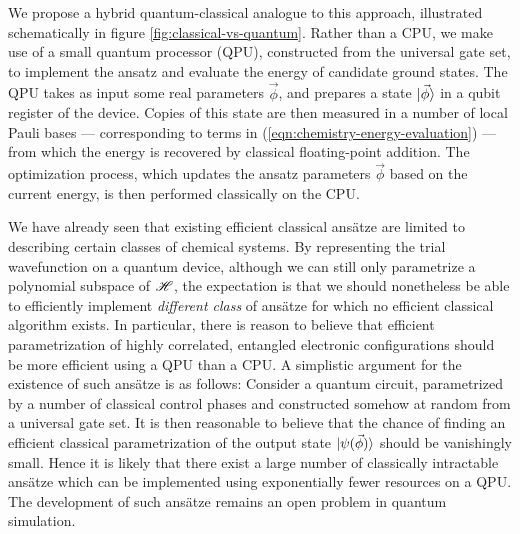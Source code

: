 We propose a hybrid quantum-classical analogue to this approach, illustrated schematically in figure \ref{fig:classical-vs-quantum}. Rather than a CPU, we make use of a small quantum processor (QPU), constructed from the universal gate set, to implement the ansatz and evaluate the energy of candidate ground states.  The QPU takes as input some real parameters $\vec{\phi}$, and prepares a state $\mbox{$ | \vec{\phi} \rangle $}$ in a qubit register of the device.  Copies of this state are then measured in a number of local Pauli bases  --- corresponding  to terms in (\ref{eqn:chemistry-energy-evaluation}) --- from which the energy is recovered by classical floating-point addition. The optimization process, which updates the ansatz parameters $\vec{\phi}$ based on the current energy, is then performed classically on the CPU.

We have already seen that existing efficient classical ans\"atze are limited to describing certain classes of chemical systems. By representing the trial wavefunction on a quantum device, although we can still only parametrize a polynomial subspace of $\mathscr{H}$, the expectation is that we should nonetheless be able to efficiently implement \emph{different class} of ans\"atze for which no efficient classical algorithm exists. In particular, there is reason to believe that efficient parametrization of highly correlated, entangled electronic configurations should be more efficient using a QPU than a CPU.  A simplistic argument for the existence of such ans\"atze is as follows: Consider a quantum circuit, parametrized by a number of classical control phases and constructed somehow at random from a universal gate set. It is then reasonable to believe that the chance of finding an efficient classical parametrization of the output state $\mbox{$ | \psi(\vec{\phi}) \rangle $}$ should be vanishingly small. Hence it is likely that there exist a large number of classically intractable ans\"atze which can be implemented using exponentially fewer resources on a QPU. The development of such ans\"atze remains an open problem in quantum simulation.

